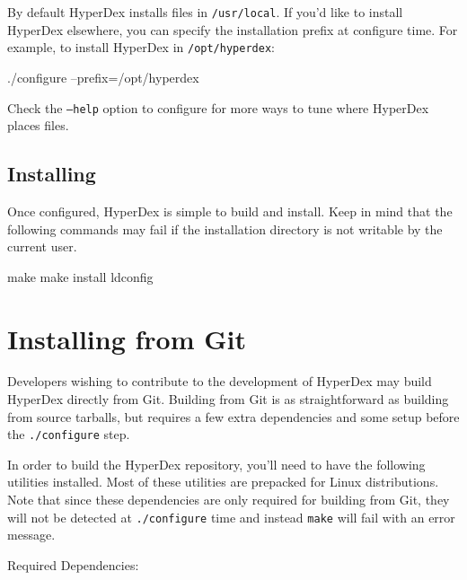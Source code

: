 By default HyperDex installs files in \texttt{/usr/local}.  If you'd like to
install HyperDex elsewhere, you can specify the installation prefix at configure
time.  For example, to install HyperDex in \texttt{/opt/hyperdex}:

\begin{consolecode}
./configure --prefix=/opt/hyperdex
\end{consolecode}

Check the \texttt{--help} option to configure for more ways to tune where
HyperDex places files.

\subsection{Installing}
\label{sec:installation:source:make}

Once configured, HyperDex is simple to build and install.  Keep in mind that the
following commands may fail if the installation directory is not writable by the
current user.

\begin{consolecode}
make
make install
ldconfig
\end{consolecode}

\section{Installing from Git}
\label{sec:installation:git}

Developers wishing to contribute to the development of HyperDex may build
HyperDex directly from Git.  Building from Git is as straightforward as building
from source tarballs, but requires a few extra dependencies and some setup
before the \texttt{./configure} step.

In order to build the HyperDex repository, you'll need to have the following
utilities installed.  Most of these utilities are prepacked for Linux
distributions.  Note that since these dependencies are only required for
building from Git, they will not be detected at \texttt{./configure} time and
instead \texttt{make} will fail with an error message.

Required Dependencies:

